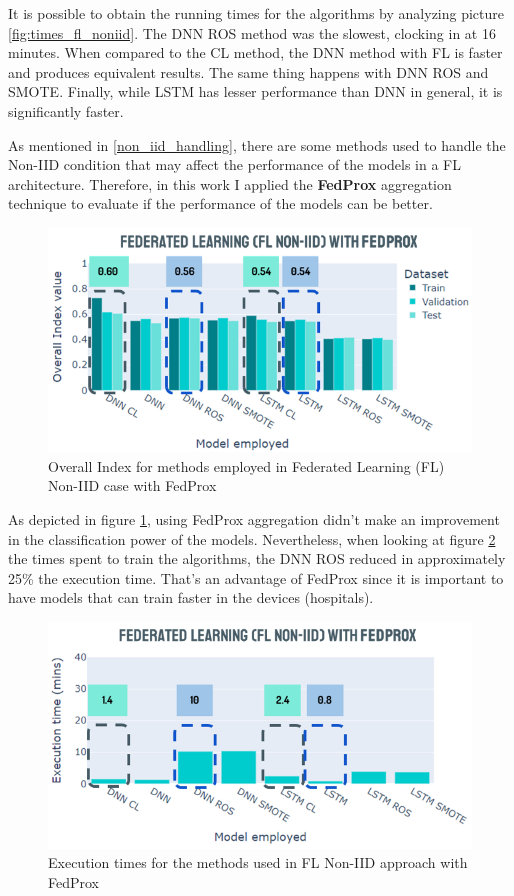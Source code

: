 It is possible to obtain the running times for the algorithms by analyzing picture \ref{fig:times_fl_noniid}. The DNN ROS method was the slowest, clocking in at 16 minutes. When compared to the CL method, the DNN method with FL is faster and produces equivalent results. The same thing happens with DNN ROS and SMOTE. Finally, while LSTM has lesser performance than DNN in general, it is significantly faster.

As mentioned in \ref{non_iid_handling}, there are some methods used to handle the Non-IID condition that may affect the performance of the models in a FL architecture. Therefore, in this work I applied the \textbf{FedProx} aggregation technique to evaluate if the performance of the models can be better. 

\begin{figure}[H]
\centering
\includegraphics[scale=0.6]{img/fl_noniid_methods_fedprox.png}
\caption{Overall Index for methods employed in Federated Learning (FL) Non-IID case with FedProx}
\label{fig:fl_noniid_methods_fedprox}
\end{figure}

As depicted in figure \ref{fig:fl_noniid_methods_fedprox}, using FedProx aggregation didn't make an improvement in the classification power of the models. Nevertheless, when looking at figure \ref{fig:times_fl_noniid_fedprox} the times spent to train the algorithms, the DNN ROS reduced in approximately 25\% the execution time.  That's an advantage of FedProx since it is important to have models that can train faster in the devices (hospitals).

\begin{figure}[H]
\centering
\includegraphics[scale=0.6]{img/times_fl_noniid_fedprox.png}
\caption{Execution times for the methods used in FL Non-IID approach with FedProx}
\label{fig:times_fl_noniid_fedprox}
\end{figure}

